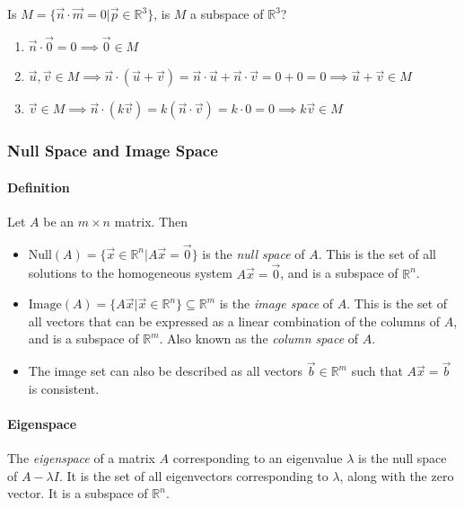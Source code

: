 Is $M = \{\vec{n} \cdot \vec{m} = 0 | \vec{p} \in \mathbb{R}^3\}$, is $M$ a subspace of $\mathbb{R}^3$?\\
\begin{enumerate}
    \item $\vec{n} \cdot \vec{0} = 0 \implies \vec{0} \in M$
    \item $\vec{u}, \vec{v} \in M \implies \vec{n} \cdot (\vec{u} + \vec{v}) = \vec{n} \cdot \vec{u} + \vec{n} \cdot \vec{v} = 0 + 0 = 0 \implies \vec{u} + \vec{v} \in M$
    \item $\vec{v} \in M \implies \vec{n} \cdot (k\vec{v}) = k(\vec{n} \cdot \vec{v}) = k \cdot 0 = 0 \implies k\vec{v} \in M$
\end{enumerate}

\subsubsection*{Null Space and Image Space}
\paragraph*{Definition} Let $A$ be an $m \times n$ matrix. Then
\begin{itemize}
    \item $\text{Null}(A) = \{\vec{x} \in \mathbb{R}^n | A\vec{x} = \vec{0}\}$ is the \emph{null space} of $A$. This is the set of all solutions to the homogeneous system $A\vec{x} = \vec{0}$, and is a subspace of $\mathbb{R}^n$.
    \item $\text{Image}(A) = \{A\vec{x} | \vec{x} \in \mathbb{R}^n\} \subseteq \mathbb{R}^m$ is the \emph{image space} of $A$. This is the set of all vectors that can be expressed as a linear combination of the columns of $A$, and is a subspace of $\mathbb{R}^m$. Also known as the \emph{column space} of $A$.
    \item The image set can also be described as all vectors $\vec{b} \in \mathbb{R}^m$ such that $A\vec{x} = \vec{b}$ is consistent.
\end{itemize}

\paragraph*{Eigenspace}
The \emph{eigenspace} of a matrix $A$ corresponding to an eigenvalue $\lambda$ is the null space of $A - \lambda I$. It is the set of all eigenvectors corresponding to $\lambda$, along with the zero vector. It is a subspace of $\mathbb{R}^n$.


